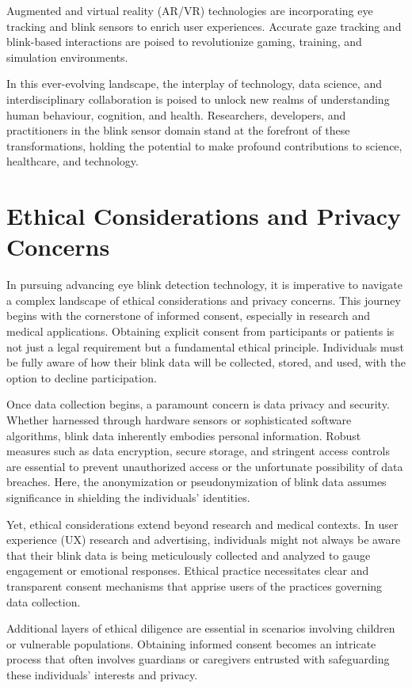 \documentclass[conference]{IEEEtran}
\begin{document}
Augmented and virtual reality (AR/VR) technologies are incorporating eye tracking and blink sensors to enrich user experiences. Accurate gaze tracking and blink-based interactions are poised to revolutionize gaming, training, and simulation environments.

In this ever-evolving landscape, the interplay of technology, data science, and interdisciplinary collaboration is poised to unlock new realms of understanding human behaviour, cognition, and health. Researchers, developers, and practitioners in the blink sensor domain stand at the forefront of these transformations, holding the potential to make profound contributions to science, healthcare, and technology.


\section{Ethical Considerations and Privacy Concerns}
In pursuing advancing eye blink detection technology, it is imperative to navigate a complex landscape of ethical considerations and privacy concerns. This journey begins with the cornerstone of informed consent, especially in research and medical applications. Obtaining explicit consent from participants or patients is not just a legal requirement but a fundamental ethical principle. Individuals must be fully aware of how their blink data will be collected, stored, and used, with the option to decline participation.

Once data collection begins, a paramount concern is data privacy and security. Whether harnessed through hardware sensors or sophisticated software algorithms, blink data inherently embodies personal information. Robust measures such as data encryption, secure storage, and stringent access controls are essential to prevent unauthorized access or the unfortunate possibility of data breaches. Here, the anonymization or pseudonymization of blink data assumes significance in shielding the individuals' identities.

Yet, ethical considerations extend beyond research and medical contexts. In user experience (UX) research and advertising, individuals might not always be aware that their blink data is being meticulously collected and analyzed to gauge engagement or emotional responses. Ethical practice necessitates clear and transparent consent mechanisms that apprise users of the practices governing data collection.

Additional layers of ethical diligence are essential in scenarios involving children or vulnerable populations. Obtaining informed consent becomes an intricate process that often involves guardians or caregivers entrusted with safeguarding these individuals' interests and privacy.
\end{document}
